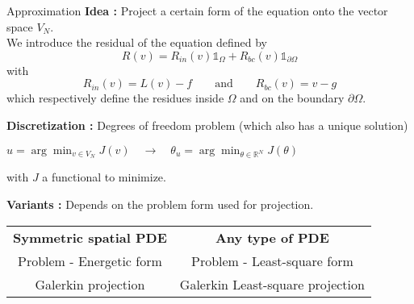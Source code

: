 \begin{frame}{Approximation}
	\textbf{Idea :} Project a certain form of the equation onto the vector space $V_N$. \\
	We introduce the residual of the equation defined by
	\begin{equation*}
		R(v) = R_{in}(v)\mathds{1}_{\Omega} + R_{bc}(v)\mathds{1}_{\partial \Omega}
	\end{equation*}
	with 
	\begin{equation*}
		R_{in}(v)=L(v) - f \qquad \text{and} \qquad R_{bc}(v)=v-g
	\end{equation*}
	which respectively define the residues inside $\Omega$ and on the boundary $\partial\Omega$. 
	
	\vspace{5pt}
	
	\textbf{Discretization :} Degrees of freedom problem (which also has a unique solution)
	\begin{center}
		$u=\arg\min_{v\in V_N} J(v) \quad \longrightarrow \quad \theta_u=\arg\min_{\theta\in \mathbb{R}^N} J(\theta) $
	\end{center}
	with $J$ a functional to minimize.
	
	\vspace{5pt}
	
	\textbf{Variants :} Depends on the problem form used for projection.
	
	\begin{center}
		\begin{tabular}{c|c}
			\textbf{Symmetric spatial PDE} & \textbf{Any type of PDE} \\
			Problem - Energetic form & Problem - Least-square form \\
			Galerkin projection & Galerkin Least-square projection
		\end{tabular}
	\end{center}
\end{frame}

